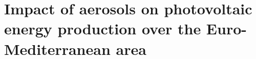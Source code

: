 \begin{subappendices}



\end{subappendices}

\clearpage


\chapter[Impact of aerosols on photovoltaic production]{Impact of aerosols on photovoltaic energy production over the Euro-Mediterranean area}

